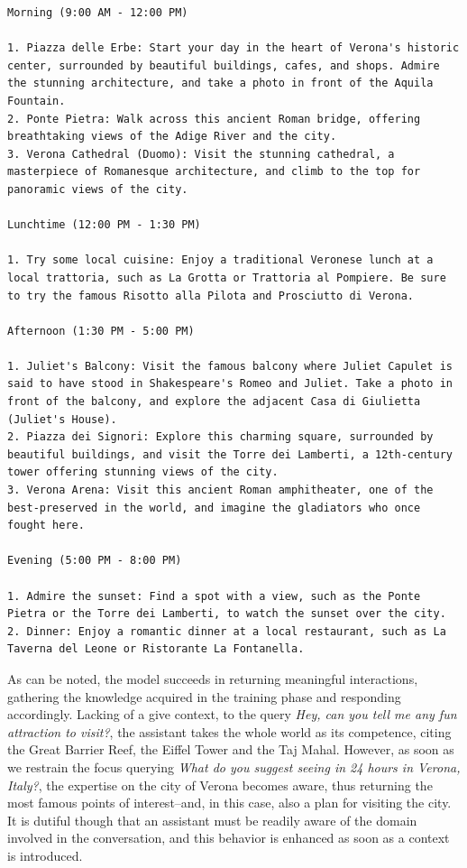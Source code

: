 \begin{Verbatim}[breaklines=true]
Morning (9:00 AM - 12:00 PM)

1. Piazza delle Erbe: Start your day in the heart of Verona's historic center, surrounded by beautiful buildings, cafes, and shops. Admire the stunning architecture, and take a photo in front of the Aquila Fountain.
2. Ponte Pietra: Walk across this ancient Roman bridge, offering breathtaking views of the Adige River and the city.
3. Verona Cathedral (Duomo): Visit the stunning cathedral, a masterpiece of Romanesque architecture, and climb to the top for panoramic views of the city.

Lunchtime (12:00 PM - 1:30 PM)

1. Try some local cuisine: Enjoy a traditional Veronese lunch at a local trattoria, such as La Grotta or Trattoria al Pompiere. Be sure to try the famous Risotto alla Pilota and Prosciutto di Verona.

Afternoon (1:30 PM - 5:00 PM)

1. Juliet's Balcony: Visit the famous balcony where Juliet Capulet is said to have stood in Shakespeare's Romeo and Juliet. Take a photo in front of the balcony, and explore the adjacent Casa di Giulietta (Juliet's House).
2. Piazza dei Signori: Explore this charming square, surrounded by beautiful buildings, and visit the Torre dei Lamberti, a 12th-century tower offering stunning views of the city.
3. Verona Arena: Visit this ancient Roman amphitheater, one of the best-preserved in the world, and imagine the gladiators who once fought here.

Evening (5:00 PM - 8:00 PM)

1. Admire the sunset: Find a spot with a view, such as the Ponte Pietra or the Torre dei Lamberti, to watch the sunset over the city.
2. Dinner: Enjoy a romantic dinner at a local restaurant, such as La Taverna del Leone or Ristorante La Fontanella.
\end{Verbatim}

As can be noted, the model succeeds in returning meaningful interactions, gathering the knowledge acquired in the training phase and responding accordingly. Lacking of a give context, to the query \textit{Hey, can you tell me any fun attraction to visit?}, the assistant takes the whole world as its competence, citing the Great Barrier Reef, the Eiffel Tower and the Taj Mahal. However, as soon as we restrain the focus querying \textit{What do you suggest seeing in 24 hours in Verona, Italy?}, the expertise on the city of Verona becomes aware, thus returning the most famous points of interest--and, in this case, also a plan for visiting the city. It is dutiful though that an assistant must be readily aware of the domain involved in the conversation, and this behavior is enhanced as soon as a context is introduced.



